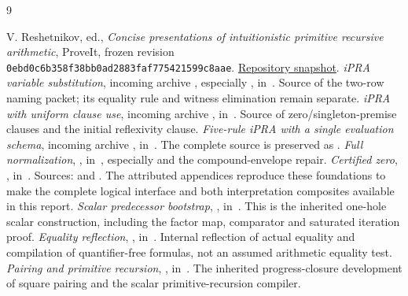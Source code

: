 \documentclass[11pt,letterpaper]{article}
\theoremstyle{definition}\newtheorem{definition}[theorem]{Definition}
\theoremstyle{remark}\newtheorem{remark}[theorem]{Remark}
\begin{document}
\begin{thebibliography}{9}\raggedright
{}
V. Reshetnikov, ed., \emph{Concise presentations of intuitionistic primitive
recursive arithmetic}, ProveIt, frozen revision
\texttt{0ebd0c6b358f38bb0ad2883faf775421599c8aae}.
\href{https://github.com/VladimirReshetnikov/ProveIt/tree/0ebd0c6b358f38bb0ad2883faf775421599c8aae/Logic/PrimitiveRecursiveArithmetic/ConciseIPRA}{Repository snapshot}.
\emph{iPRA variable substitution}, incoming archive
, especially
, in~\cite{baseline}.
Source of the two-row naming packet; its equality rule and witness
elimination remain separate.
\emph{iPRA with uniform clause use}, incoming archive
, in~\cite{baseline}.
Source of zero/singleton-premise clauses and the initial reflexivity clause.
\emph{Five-rule iPRA with a single evaluation schema}, incoming archive
, in~\cite{baseline}.
The complete source is preserved as .
\emph{Full normalization}, , in~\cite{baseline},
especially  and the compound-envelope repair.
\emph{Certified zero}, , in~\cite{baseline}.
Sources:  and
. The attributed appendices reproduce
these foundations to make the complete logical interface and
both interpretation composites available in this report.
\emph{Scalar predecessor bootstrap},
, in~\cite{baseline}.
This is the inherited one-hole scalar construction, including the factor
map, comparator and saturated iteration proof.
\emph{Equality reflection},
, in~\cite{baseline}.
Internal reflection of actual equality and compilation of quantifier-free
formulas, not an assumed arithmetic equality test.
\emph{Pairing and primitive recursion},
, in~\cite{baseline}.
The inherited progress-closure development of square pairing and the scalar
primitive-recursion compiler.
\end{thebibliography}
\end{document}
